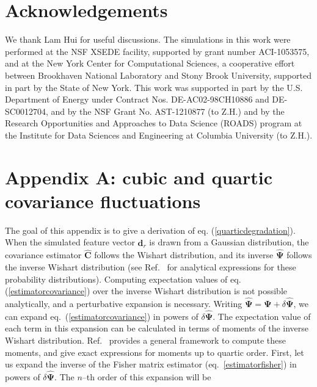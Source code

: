 \documentclass[reprint,aps,prd,superscriptaddress,showkeys,showpacs]{revtex4-1}
\newcommand{\bb}[1]{\mathbf{#1}}
\newcommand{\bbh}[1]{\mathbf{\hat{#1}}}
\begin{document}
 

\section*{Acknowledgements}
We thank Lam Hui for useful discussions.  The simulations in this work
were performed at the NSF XSEDE facility, supported by grant number
ACI-1053575, and at the New York Center for Computational Sciences, a
cooperative effort between Brookhaven National Laboratory and Stony
Brook University, supported in part by the State of New York. This
work was supported in part by the U.S. Department of Energy under
Contract Nos. DE-AC02-98CH10886 and DE-SC0012704, and by the NSF Grant
No. AST-1210877 (to Z.H.) and by the Research Opportunities and
Approaches to Data Science (ROADS) program at the Institute for Data
Sciences and Engineering at Columbia University (to Z.H.).  



\section*{Appendix A: cubic and quartic covariance fluctuations}
\label{appendixA}

The goal of this appendix is to give a derivation of
eq. (\ref{quarticdegradation}). When the simulated feature vector
$\bbh{d}_r$ is drawn from a Gaussian distribution, the covariance
estimator $\bbh{C}$ follows the Wishart distribution, and its inverse
$\bbh{\Psi}$ follows the inverse Wishart distribution (see
Ref.~\citep{Taylor12} for analytical expressions for these probability
distributions). Computing expectation values of
eq. (\ref{estimatorcovariance}) over the inverse Wishart distribution
is not possible analytically, and a perturbative expansion is
necessary. Writing $\bbh{\Psi}=\bb{\Psi}+\delta\bbh{\Psi}$, we can
expand eq.~(\ref{estimatorcovariance}) in powers of
$\delta\bbh{\Psi}$. The expectation value of each term in this
expansion can be calculated in terms of moments of the inverse Wishart
distribution. Ref.~\citep{MasumotoWishart} provides a general
framework to compute these moments, and give exact expressions for
moments up to quartic order. First, let us expand the inverse of the
Fisher matrix estimator (eq.~\ref{estimatorfisher}) in powers of
$\delta\bbh{\Psi}$. The $n$--th order of this expansion will be
\end{document}
